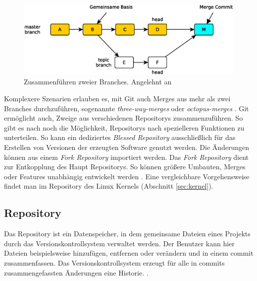 \begin{figure}[hb]
  \centering
  \includegraphics[scale=0.60]{images/merge.eps}
  \caption{Zusammenführen zweier Branches. Angelehnt an \cite[83]{gitosp}}
  \label{fig:merge}
\end{figure}

Komplexere Szenarien erlauben es, mit Git auch Merges aus mehr als zwei
Branches durchzuführen, sogenannte \textit{three-way-merges} oder
\textit{octopus-merges} \cite[S.~87]{gitosp}. Git ermöglicht auch, Zweige aus
verschiedenen Repositorys zusammenzuführen. So gibt es nach \cite[3]{gitwf}
noch die Möglichkeit, Repositorys nach spezielleren Funktionen zu unterteilen.
So kann ein dediziertes \textit{Blessed Repository} ausschließlich für das
Erstellen von Versionen der erzeugten Software genutzt werden. Die Änderungen
können aus einem \textit{Fork Repository} importiert werden. Das \textit{Fork
Repository} dient zur Entkopplung des Haupt Repositorys. So können größere
Umbauten, Merges oder Features unabhängig entwickelt werden
\cite[S.~123]{gitwf}. Eine vergleichbare Vorgehensweise findet man im
Repository des Linux Kernels \cite{link:linuxgit} (Abschnitt \ref{sec:kernel}).

\subsection{Repository}\label{sec:repository}
Das Repository ist ein Datenspeicher, in dem gemeinsame Dateien eines Projekts
durch das Versionskontrollsystem verwaltet werden. Der Benutzer kann hier Dateien
beispielsweise hinzufügen, entfernen oder verändern und in einem
\gls{commit} zusammenfassen. Das Versionskontrollsystem erzeugt für alle in
\glspl{commit} zusammengefassten Änderungen eine Historie.
 \cite[S.~38]{hagen:1678}.

